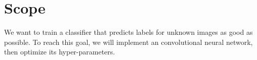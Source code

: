 \section{Scope}
We want to train a classifier that predicts labels for unknown images as good as possible.
To reach this goal, we will implement an convolutional neural network, then optimize its hyper-parameters.